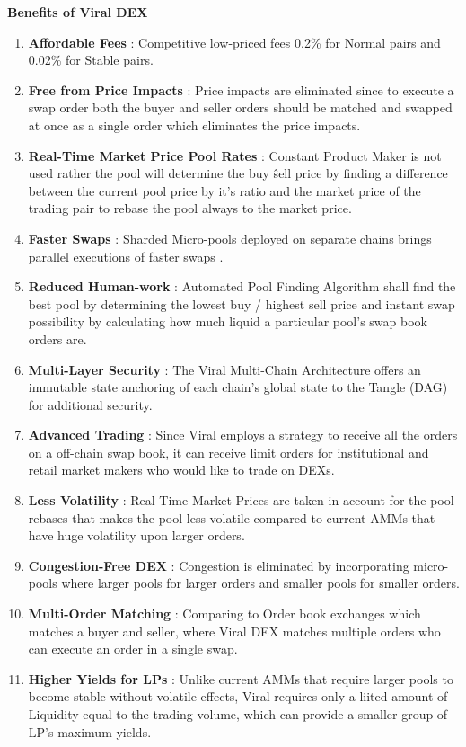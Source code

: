 \documentclass[conference]{IEEEtran}
\begin{document}
\textbf{Benefits of Viral DEX}
\begin{enumerate}[wide, labelwidth=!, labelindent=0pt]
\item \textbf{Affordable Fees} : Competitive low-priced fees 0.2\% for Normal pairs and 0.02\% for Stable pairs.
\item \textbf{Free from Price Impacts} : Price impacts are eliminated since to execute a swap order both the buyer and seller orders should be matched and swapped at once as a single order which eliminates the price impacts.
\item \textbf{Real-Time Market Price Pool Rates} : Constant Product Maker is not used rather the pool will determine the buy \^ sell price by finding a difference between the current pool price by it's ratio and the market price of the trading pair to rebase the pool always to the market price.
\item \textbf{Faster Swaps} : Sharded Micro-pools deployed on separate chains brings parallel executions of faster swaps .
\item \textbf{Reduced Human-work} : Automated Pool Finding Algorithm shall find the best pool by determining the lowest buy / highest sell price and instant swap possibility by calculating how much liquid a particular pool's swap book orders are.
\item \textbf{Multi-Layer Security} : The Viral Multi-Chain Architecture  offers an immutable state anchoring of each chain's global state to the Tangle (DAG) for additional security.
\item \textbf{Advanced Trading} : Since Viral employs a strategy to receive all the orders on a off-chain swap book, it can receive limit orders for institutional and retail market makers who would like to trade on DEXs.
\item \textbf{Less Volatility} : Real-Time Market Prices are taken in account for the pool rebases that makes the pool less volatile compared to current AMMs that have huge volatility upon larger orders.
\item \textbf{Congestion-Free DEX} : Congestion is eliminated by incorporating micro-pools where larger pools for larger orders and smaller pools for smaller orders.
\item \textbf{Multi-Order Matching} : Comparing to Order book exchanges which matches a buyer and seller, where Viral DEX matches multiple orders who can execute an order in a single swap.
\item \textbf{Higher Yields for LPs} : Unlike current AMMs that require larger pools to become stable without volatile effects, Viral requires only a liited amount of Liquidity equal to the trading volume, which can provide a smaller group of LP's maximum yields.
\end{enumerate}
\end{document}
